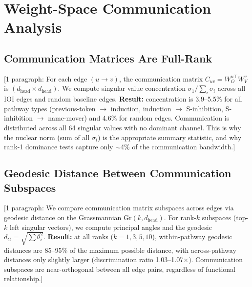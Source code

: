 \documentclass[11pt]{article}
\begin{document}
\section{Weight-Space Communication Analysis}
\label{app:weight_comms}


\subsection{Communication Matrices Are Full-Rank}
\label{app:comm_full_rank}

[1 paragraph: For each edge $(u \to v)$, the communication matrix
$C_{uv} = W_O^{u\top} W_V^v$ is $(d_\text{head} \times d_\text{head})$.
We compute singular value concentration $\sigma_1 / \sum_i \sigma_i$
across all IOI edges and random baseline edges. \textbf{Result:}
concentration is 3.9--5.5\% for all pathway types (previous-token
$\to$ induction, induction $\to$ S-inhibition, S-inhibition $\to$
name-mover) and 4.6\% for random edges. Communication is distributed
across all 64 singular values with no dominant channel. This is why
the nuclear norm (sum of all $\sigma_i$) is the appropriate summary
statistic, and why rank-1 dominance tests
capture only $\sim$4\% of the communication bandwidth.]

\subsection{Geodesic Distance Between Communication Subspaces}
\label{app:comm_geodesic}


[1 paragraph: We compare communication matrix subspaces across edges
via geodesic distance on the Grassmannian $\mathrm{Gr}(k, d_\text{head})$.
For rank-$k$ subspaces (top-$k$ left singular vectors), we compute
principal angles and the geodesic $d_G = \sqrt{\sum \theta_i^2}$.
\textbf{Result:} at all ranks ($k = 1, 3, 5, 10$), within-pathway
geodesic distances are 85--95\% of the maximum possible distance,
with across-pathway distances only slightly larger (discrimination
ratio 1.03--1.07$\times$). Communication subspaces are near-orthogonal
between all edge pairs, regardless of functional relationship.]
\end{document}
